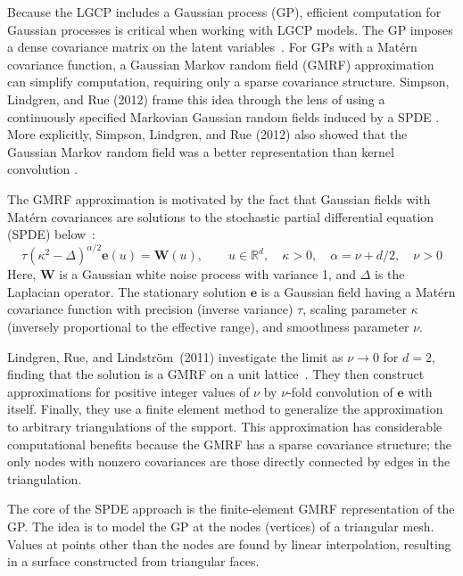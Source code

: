 \documentclass{interact}
\begin{document}
Because the LGCP includes a Gaussian process (GP), efficient computation for
Gaussian processes is critical when working with LGCP models. The GP imposes a
dense covariance matrix on the latent variables~\cite{rinla}. For GPs with a
Mat\'{e}rn covariance function, a Gaussian Markov random field (GMRF)
approximation can simplify computation, requiring only a sparse covariance
structure. Simpson, Lindgren, and Rue (2012) frame this idea through the lens of using a continuously specified Markovian Gaussian random fields induced by a SPDE \cite{simpson2012think}. More explicitly, Simpson, Lindgren, and Rue (2012) also showed that the Gaussian Markov random field was a better representation than kernel convolution \cite{simpson2012order}.

The GMRF approximation is motivated by the fact that Gaussian fields with
Mat\'{e}rn covariances are solutions to the stochastic partial differential
equation (SPDE) below~\cite{lindgrenetal}:
\begin{equation}
\tau(\kappa^{2} - \Delta)^{\alpha / 2} \mathbf{e}(u) = \mathbf{W}(u),
\qquad u \in \mathbb{R}^d, \quad \kappa > 0,
\quad \alpha = \nu + d/2, \quad \nu > 0
\end{equation}
Here, \(\mathbf{W}\) is a Gaussian white noise process with variance 1, and
\(\Delta\) is the Laplacian operator. The stationary solution
\(\mathbf{e}\) is a Gaussian field having a Mat\'{e}rn covariance
function with precision (inverse variance) \(\tau\),  scaling parameter
\(\kappa\) (inversely proportional to the effective range), and smoothness
parameter \(\nu\).

Lindgren, Rue, and Lindstr\"{o}m~(2011) investigate the limit as \(\nu \to 0\) for
\(d = 2\), finding that the solution is a GMRF on a unit
lattice~\cite{lindgrenetal}. They then construct approximations for positive
integer values of \(\nu\) by \(\nu\)-fold convolution of \(\mathbf{e}\)
with itself. Finally, they use a finite element method to generalize the
approximation to arbitrary triangulations of the support. This approximation
has considerable computational benefits because the GMRF has a sparse
covariance structure; the only nodes with nonzero covariances are those
directly connected by edges in the triangulation.

The core of the SPDE approach is the finite-element GMRF representation of the
GP. The idea is to model the GP at the nodes (vertices) of a triangular mesh.
Values at points other than the nodes are found by linear interpolation,
resulting in a surface constructed from triangular faces.
\end{document}
